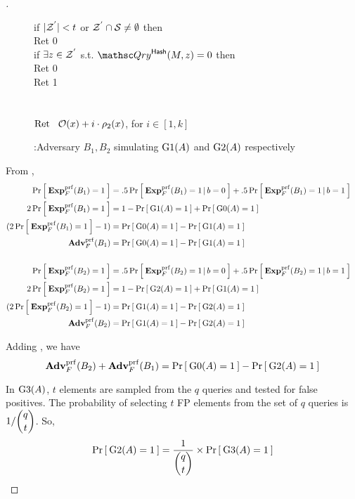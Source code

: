 \begin{proof}[]
\begin{figure}
{{if $|{\cal Z}^{'}| < t$ or ${\cal Z}^{'} \cap {\cal S} \neq \emptyset$ then \\
\nudge Ret 0\\
if $\exists z \in {\cal Z}^{'}$ s.t. $\Qry^{\HashOracle}(M,z)=0$ then\\
\nudge Ret 0\\
Ret 1\\\\
\\
$\mathrm{Ret} \hspace*{2ex} {\cal O}(x) + i\cdot \rho_2(x)$, for $i\in[1,k]$
}
}
\caption{:Adversary $B_1, B_2$ simulating $\text{G1}(A)$ and $\text{G2}(A)$ respectively}\label{fig:BGame1}
\end{figure}
\noindent
From ,  
\begin{align}
\nonumber \Pr\left[\: \mathbf{Exp}^{\mathrm{prf}}_{F}(B_1) = 1 \:\right] &= .5\Pr\left[\: \mathbf{Exp}^{\mathrm{prf}}_{F}(B_1)=1\,|\,b=0 \:\right] + .5\Pr\left[\: \mathbf{Exp}^{\mathrm{prf}}_{F}(B_1) = 1\,|\,b=1 \:\right]\\
\nonumber 2\Pr\left[\: \mathbf{Exp}^{\mathrm{prf}}_{F}(B_1) = 1 \:\right] &= 1-\Pr\left[\: \text{G1}(A)=1 \:\right] + \Pr\left[\: \text{G0}(A)=1 \:\right]\\
\nonumber (2\Pr\left[\: \mathbf{Exp}^{\mathrm{prf}}_{F}(B_1) = 1 \:\right] - 1)  &= \Pr\left[\: \text{G0}(A)=1 \:\right] - \Pr\left[\: \text{G1}(A)=1 \:\right]\\
 \mathbf{Adv}^{\mathrm{prf}}_{F}(B_1) &= \Pr\left[\: \text{G0}(A)=1 \:\right] - \Pr\left[\: \text{G1}(A)=1 \:\right] \label{eq:1}\\
\nonumber& &\\
\nonumber \Pr\left[\: \mathbf{Exp}^{\mathrm{prf}}_{F}(B_2) = 1 \:\right] &= .5\Pr\left[\: \mathbf{Exp}^{\mathrm{prf}}_{F}(B_2)=1\,|\,b=0 \:\right] + .5\Pr\left[\: \mathbf{Exp}^{\mathrm{prf}}_{F}(B_2) = 1\,|\,b=1 \:\right]\\
\nonumber 2\Pr\left[\: \mathbf{Exp}^{\mathrm{prf}}_{F}(B_2) = 1 \:\right] &= 1-\Pr\left[\: \text{G2}(A)=1 \:\right] + \Pr\left[\: \text{G1}(A)=1 \:\right]\\
\nonumber (2\Pr\left[\: \mathbf{Exp}^{\mathrm{prf}}_{F}(B_2) = 1 \:\right] - 1)  &= \Pr\left[\: \text{G1}(A)=1 \:\right] - \Pr\left[\: \text{G2}(A)=1 \:\right]\\
 \mathbf{Adv}^{\mathrm{prf}}_{F}(B_2) &= \Pr\left[\: \text{G1}(A)=1 \:\right] - \Pr\left[\: \text{G2}(A)=1 \:\right] \label{eq:2a}
\end{align}

\noindent
Adding , we have
\begin{equation}
\mathbf{Adv}^{\mathrm{prf}}_{F}(B_2) +\mathbf{Adv}^{\mathrm{prf}}_{F}(B_1) = \Pr\left[\: \text{G0}(A)=1 \:\right] - \Pr\left[\: \text{G2}(A)=1 \:\right]\label{eq:2}
\end{equation}

\noindent
In $\text{G3}(A)$, $t$ elements are sampled from the $q$ queries and tested for false positives. The probability of selecting $t$ FP elements from the set of $q$ queries is $1/\dbinom{q}{t}$. So, 
\begin{equation}
\Pr\left[\: \text{G2}(A)=1 \:\right] = \frac{1}{\dbinom{q}{t}}\times\Pr\left[\: \text{G3}(A)=1 \:\right]\label{eq:3}
\end{equation}


\end{proof}
